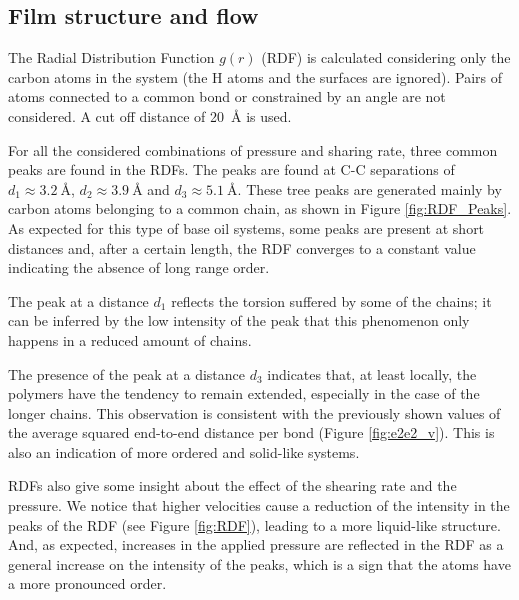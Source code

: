 \documentclass[aps,prb,reprint,superscriptaddress, a4paper]{revtex4-1}
\begin{document}
\subsection{Film structure and flow}

The Radial Distribution Function $g(r)$ (RDF) is calculated considering only the carbon atoms in the system (the H atoms and the surfaces are ignored). Pairs of atoms connected to a common bond or constrained by an angle are not considered. A cut off distance of \SI{20}{\angstrom} is used.

For all the considered combinations of pressure and sharing rate, three common peaks are found in the RDFs. The  peaks are found at C-C separations of $d_1  \approx \SI{3.2}{\angstrom}$,  $d_2 \approx \SI{3.9}{\angstrom}$ and $d_3 \approx \SI{5.1}{\angstrom}$. These tree peaks are generated mainly by carbon atoms belonging to a common chain, as shown in Figure \ref{fig:RDF_Peaks}. As expected for this type of base oil systems, some peaks are present  at short distances and, after a certain length, the RDF converges to a constant value indicating the absence of long range order.

The peak at a distance $d_1$ reflects the torsion suffered by some of the chains; it can be inferred by the low intensity of the peak that this phenomenon only happens in a reduced amount of chains. 

The presence of the peak at a distance $d_3$ indicates that, at least locally, the polymers have the tendency to remain extended, especially in the case of the longer chains. This observation is consistent with the previously shown values of the average squared end-to-end distance per bond (Figure \ref{fig:e2e2_v}). This is also an indication of more ordered and solid-like systems.

RDFs also give some insight about the effect of the shearing rate and the pressure. We notice that higher velocities cause a reduction of the intensity in  the peaks of the RDF (see Figure \ref{fig:RDF}), leading to a more liquid-like structure. And, as expected, increases in the applied pressure are reflected in the RDF as a general increase on the intensity of the peaks, which is a sign that the atoms have a more pronounced order.
\end{document}
